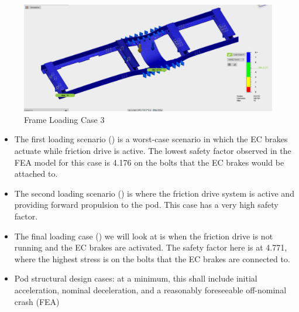 \documentclass[main.tex]{subfiles}
\begin{document}
    \begin{figure}
        \centering
        \includegraphics[width=\linewidth]{images/frame3}
        \caption{Frame Loading Case 3}
        \label{fig:frame3}
    \end{figure}
    \begin{itemize}
    \item The first loading scenario () is a worst-case scenario in which the EC brakes actuate while friction drive is active. The lowest safety factor observed in the FEA model for this case is 4.176 on the bolts that the EC brakes would be attached to.
    \item The second loading scenario () is where the friction drive system is active and providing forward propulsion to the pod. This case has a very high safety factor.
	\item The final loading case () we will look at is when the friction drive is not running and the EC brakes are activated. The safety factor here is at 4.771, where the highest stress is on the bolts that the EC brakes are connected to.
	\item Pod structural design cases: at a minimum, this shall include initial acceleration, nominal deceleration, and a reasonably foreseeable off-nominal crash (FEA)
    \end{itemize}
\end{document}
